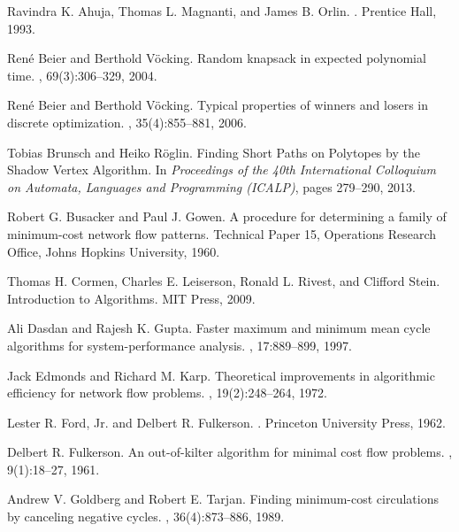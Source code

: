 \documentclass[11pt]{article}
\begin{document}
\begin{thebibliography}{99}

Ravindra K. Ahuja, Thomas L. Magnanti, and James B. Orlin.
.
\newblock Prentice Hall, 1993.

Ren{\'e} Beier and Berthold V{\"o}cking.
\newblock Random knapsack in expected polynomial time.
, 69(3):306--329, 2004.

Ren{\'e} Beier and Berthold V{\"o}cking.
\newblock Typical properties of winners and losers in discrete optimization.
, 35(4):855--881, 2006.

Tobias Brunsch and Heiko R{\"o}glin.
\newblock Finding Short Paths on Polytopes by the Shadow Vertex Algorithm.
\newblock In {\em Proceedings of the 40th International Colloquium on Automata, Languages and Programming (ICALP)}, pages 279--290, 2013.

Robert G. Busacker and Paul J. Gowen.
\newblock A procedure for determining a family of minimum-cost network flow
  patterns.
\newblock Technical Paper 15, Operations Research Office, Johns Hopkins University, 1960.

Thomas H. Cormen, Charles E. Leiserson, Ronald L. Rivest, and Clifford Stein. 
\newblock Introduction to Algorithms.
\newblock MIT Press, 2009.

Ali Dasdan and Rajesh K. Gupta.
\newblock Faster maximum and minimum mean cycle algorithms for
  sys\-tem-per\-for\-mance analysis.
, 17:889--899, 1997.

Jack Edmonds and Richard M. Karp.
\newblock Theoretical improvements in algorithmic efficiency for network flow
  problems.
, 19(2):248--264, 1972.

Lester R. Ford, Jr. and Delbert R. Fulkerson.
.
\newblock Princeton University Press, 1962.

Delbert R. Fulkerson.
\newblock An out-of-kilter algorithm for minimal cost flow problems.
, 9(1):18--27, 1961.

Andrew V. Goldberg and Robert E. Tarjan.
\newblock Finding minimum-cost circulations by canceling negative cycles.
, 36(4):873--886, 1989.


\end{thebibliography}
\end{document}
